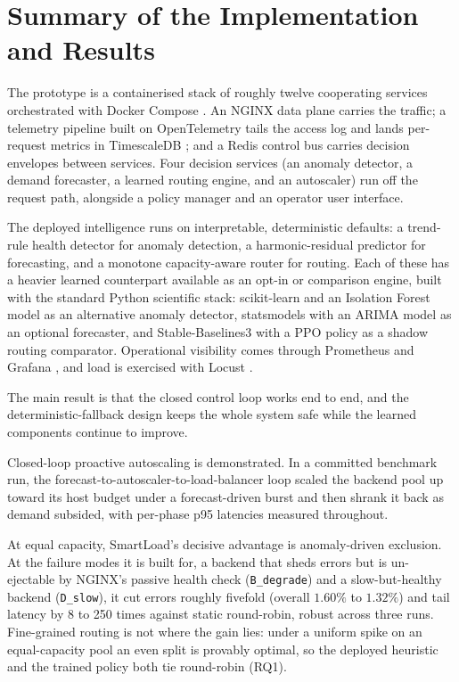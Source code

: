 \section{Summary of the Implementation and Results}
\label{sec:intro:results}

The prototype is a containerised stack of roughly twelve cooperating services
orchestrated with Docker Compose \cite{merkel2014docker}. An NGINX data plane
\cite{nginx} carries the traffic; a telemetry pipeline built on OpenTelemetry
\cite{opentelemetry} tails the access log and lands per-request metrics in
TimescaleDB \cite{timescaledb}; and a Redis \cite{carlson2013redis} control bus
carries decision envelopes between services. Four decision services (an anomaly
detector, a demand forecaster, a learned routing engine, and an autoscaler) run
off the request path, alongside a policy manager and an operator user interface.

The deployed intelligence runs on interpretable, deterministic defaults: a
trend-rule health detector for anomaly detection, a harmonic-residual predictor
for forecasting, and a monotone capacity-aware router for routing. Each of these
has a heavier learned counterpart available as an opt-in or comparison engine,
built with the standard Python scientific stack: scikit-learn and an Isolation
Forest model \cite{liu2008isolationforest} as an alternative anomaly detector,
statsmodels with an ARIMA model \cite{box2015timeseries} as an optional
forecaster, and Stable-Baselines3 \cite{raffin2021sb3} with a PPO policy
\cite{schulman2017ppo} as a shadow routing comparator. Operational visibility comes through Prometheus
\cite{prometheus} and Grafana \cite{grafana}, and load is exercised with Locust
\cite{locust}.

The main result is that the closed control loop works end to end, and the
deterministic-fallback design keeps the whole system safe while the learned
components continue to improve.

Closed-loop proactive autoscaling is demonstrated. In a committed benchmark run,
the forecast-to-autoscaler-to-load-balancer loop scaled the backend pool up
toward its host budget under a forecast-driven burst and then shrank it back as
demand subsided, with per-phase p95 latencies measured throughout.

At equal capacity, SmartLoad's decisive advantage is anomaly-driven exclusion. At the
failure modes it is built for, a backend that sheds errors but is un-ejectable by
NGINX's passive health check (\texttt{B\_degrade}) and a slow-but-healthy backend
(\texttt{D\_slow}), it cut errors roughly fivefold (overall $1.60\%$ to $1.32\%$) and
tail latency by 8 to 250 times against static round-robin, robust across three runs.
Fine-grained routing is not where the gain lies: under a uniform spike on an
equal-capacity pool an even split is provably optimal, so the deployed heuristic and the
trained policy both tie round-robin (RQ1).

